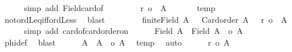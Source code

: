 \begin{isabellebody}
\ \ \ \ \isamarkupfalse%
\ {\isacharparenleft}{\kern0pt}simp\ add{\isacharcolon}{\kern0pt}\ Field{\isacharunderscore}{\kern0pt}card{\isacharunderscore}{\kern0pt}of{\isacharparenright}{\kern0pt}\isanewline
\ \ \ \ \isamarkupfalse%
\ \isamarkupfalse%
\ {\isachardoublequoteopen}{\isasymnot}\ r\ {\isasymle}o\ {\isacharbar}{\kern0pt}\ A{}\ {\isacharbar}{\kern0pt}{\isachardoublequoteclose}\isanewline
\ \ \ \ \isamarkupfalse%
\ temp{}\ {}{}\ {}\ \isamarkupfalse%
\ not{\isacharunderscore}{\kern0pt}ordLeq{\isacharunderscore}{\kern0pt}iff{\isacharunderscore}{\kern0pt}ordLess\ \isamarkupfalse%
\ blast\isanewline
\ \ \ \ \isamarkupfalse%
\ \isamarkupfalse%
\ {\isachardoublequoteopen}{\isasymnot}\ finite{\isacharparenleft}{\kern0pt}Field\ {\isacharbar}{\kern0pt}A{}{\isacharbar}{\kern0pt}\ {\isacharparenright}{\kern0pt}\ {\isasymand}\ Card{\isacharunderscore}{\kern0pt}order\ {\isacharbar}{\kern0pt}A{}{\isacharbar}{\kern0pt}\ {\isasymand}\ {\isasymnot}\ r\ {\isasymle}o\ {\isacharbar}{\kern0pt}\ A{}\ {\isacharbar}{\kern0pt}{\isachardoublequoteclose}\isanewline
\ \ \ \ \isamarkupfalse%
\ {\isacharparenleft}{\kern0pt}simp\ add{\isacharcolon}{\kern0pt}\ card{\isacharunderscore}{\kern0pt}of{\isacharunderscore}{\kern0pt}card{\isacharunderscore}{\kern0pt}order{\isacharunderscore}{\kern0pt}on{\isacharparenright}{\kern0pt}\isanewline
\ \ \ \ \isamarkupfalse%
\ {\isachardoublequoteopen}{\isacharbar}{\kern0pt}Field\ {\isacharbar}{\kern0pt}A{}{\isacharbar}{\kern0pt}\ {\isasymtimes}\ Field\ {\isacharbar}{\kern0pt}A{}{\isacharbar}{\kern0pt}\ {\isacharbar}{\kern0pt}\ {\isasymle}o\ {\isacharbar}{\kern0pt}A{}{\isacharbar}{\kern0pt}{\isachardoublequoteclose}\isanewline
\ \ \ \ \isamarkupfalse%
\ {}\ \isamarkupfalse%
\ phi{\isacharunderscore}{\kern0pt}def\ \isamarkupfalse%
\ blast\isanewline
\ \ \ \ \isamarkupfalse%
\ {\isachardoublequoteopen}{\isacharbar}{\kern0pt}A{}\ {\isasymtimes}\ A{}\ {\isacharbar}{\kern0pt}\ {\isasymle}o\ {\isacharbar}{\kern0pt}A{}{\isacharbar}{\kern0pt}{\isachardoublequoteclose}\ \isamarkupfalse%
\ temp{}\ \isamarkupfalse%
\ auto\isanewline
\ \ \ \ \isamarkupfalse%
\ {\isachardoublequoteopen}r\ {\isasymle}o\ {\isacharbar}{\kern0pt}A{}{\isacharbar}{\kern0pt}{\isachardoublequoteclose}\ \isamarkupfalse%

\end{isabellebody}
